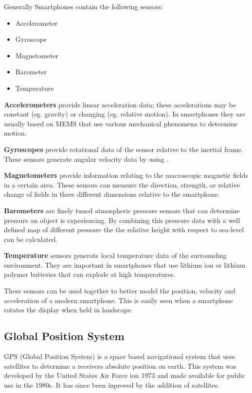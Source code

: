 Generally Smartphones contain the following sensors:
\begin{itemize}
\item Accelerometer
\item Gyroscope
\item Magnetometer
\item Barometer
\item Temperature
\end{itemize}

\textbf{Accelerometers} provide linear acceleration data; these accelerations may be constant (eg. gravity) or changing (eg. relative motion). In smartphones they are usually based on MEMS that use various mechanical phenomena to determine motion. 

\textbf{Gyroscopes} provide rotational data of the sensor relative to the inertial frame.  These sensors generate angular velocity data by using .

\textbf{Magnetometers} provide information relating to the macroscopic magnetic fields in a certain area. These sensors can measure the direction, strength, or relative change of fields in three different dimensions relative to the smartphone. 

\textbf{Barometers} are finely tuned atmospheric pressure sensors that can determine pressure an object is experiencing. By combining this pressure data with a well defined map of different pressure the the relative height with respect to sea-level can be calculated.

\textbf{Temperature} sensors generate local temperature data of the surrounding environment. They are important in smartphones that use lithium ion or lithium polymer batteries that can explode at high temperatures.

These sensors can be used together to better model the position, velocity and acceleration of a modern smartphone. This is easily seen when a smartphone rotates the display when held in landscape.


\subsection{Global Position System}
GPS (Global Position System) is a space based navigational system that uses satellites to determine a receivers absolute position on earth. This system was developed by the United States Air Force ion 1973 and made available for public use in the 1980s. It has since been inproved by the addition of satellites.


